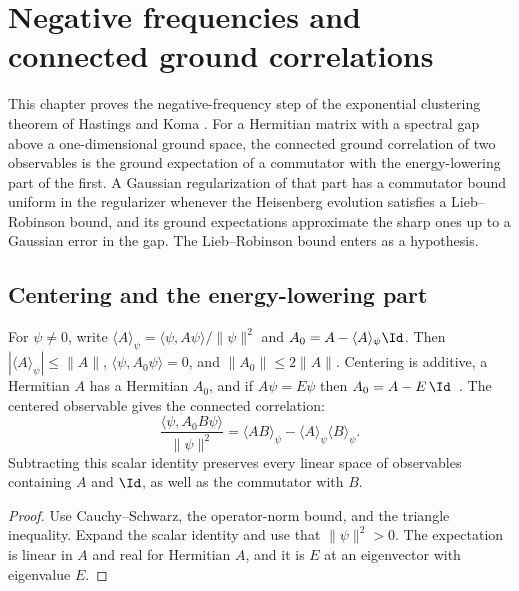 \chapter{Negative frequencies and connected ground correlations}
\label{chap:negative_frequencies}

This chapter proves the negative-frequency step of the exponential
clustering theorem of Hastings and Koma
\cite[Section 3, Lemma 3.1]{Hastings2006Spectral}. For a Hermitian
matrix with a spectral gap above a one-dimensional ground space, the
connected ground correlation of two observables is the ground expectation
of a commutator with the energy-lowering part of the first. A Gaussian
regularization of that part has a commutator bound uniform in the
regularizer whenever the Heisenberg evolution satisfies a Lieb--Robinson
bound, and its ground expectations approximate the sharp ones up to a
Gaussian error in the gap. The Lieb--Robinson bound enters as a
hypothesis.

\section{Centering and the energy-lowering part}
\label{sec:hk_energy_lowering}

\begin{lemma}
    \label{lem:hk_observable_centering}
    \leanok
    For $\psi\ne0$, write
    $\langle A\rangle_\psi=\langle\psi,A\psi\rangle/\|\psi\|^2$
    and $A_0=A-\langle A\rangle_\psi\Id$. Then
    $|\langle A\rangle_\psi|\le\|A\|$,
    $\langle\psi,A_0\psi\rangle=0$, and $\|A_0\|\le2\|A\|$. Centering is additive, a
    Hermitian $A$ has a Hermitian $A_0$, and if $A\psi=E\psi$ then
    $A_0=A-E\,\Id$~\cite{Hastings2007AreaLaw}.
    The centered observable gives the connected correlation:
    \[
        \frac{\langle\psi,A_0B\psi\rangle}{\|\psi\|^2}
        =\langle AB\rangle_\psi
        -\langle A\rangle_\psi\langle B\rangle_\psi.
    \]
    Subtracting this scalar identity preserves every linear space of
    observables containing $A$ and $\Id$, as well as the commutator with $B$.
\end{lemma}
\begin{proof}\leanok
    Use Cauchy--Schwarz, the operator-norm bound, and the triangle
    inequality. Expand the scalar identity and use that $\|\psi\|^2>0$. The expectation is
    linear in $A$ and real for Hermitian $A$, and it is $E$ at an eigenvector with eigenvalue
    $E$.
\end{proof}

